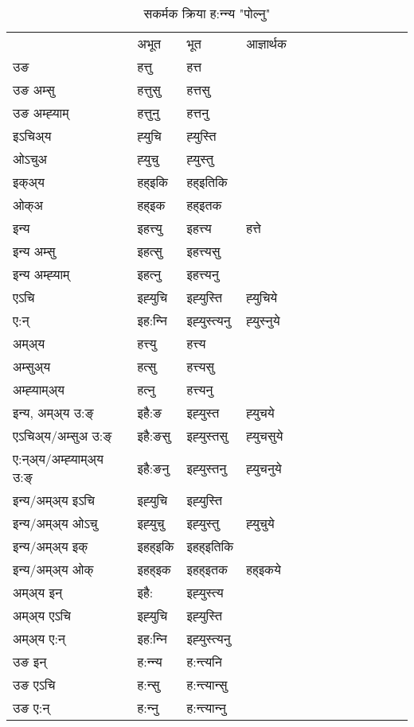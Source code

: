\begin{table}[H]
\centering
\caption{\label{utt.vt} सकर्मक क्रिया  ह:न्‍न्य  "पोल्नु"  }
\begin{tabular}{l|l|l|l|l|l|l|l|l|l|l|l|l}  \toprule
&अभूत & भूत & आज्ञार्थक \\ 
उङ &हत्तु &हत्त \\ 
उङ अम्सु&हत्तुसु &हत्तसु \\ 
उङ अम्ह्‍याम्&हत्तुनु &हत्तनु \\ 
इऽचिअ्य &ह्‍युचि &ह्‍युस्ति   \\ 
ओऽचुअ        &ह्‍युचु &ह्‍युस्तु   \\ 
इक्अ्य&हह्इकि &हह्इतिकि   \\ 
ओक्अ &हह्इक &हह्इतक   \\ 
इन्य & इहत्त्यु  & इहत्त्य &हत्ते  \\ 
इन्य अम्सु& इहत्सु  & इहत्त्यसु   \\ 
इन्य अम्ह्‍याम्& इहत्‍नु  & इहत्त्यनु   \\ 
एऽचि & इह्‍युचि & इह्‍युस्ति &ह्‍युचिये    \\ 
ए:न् & इह:न्‍नि  & इह्‍युस्त्यनु &ह्‍युस्‍नुये  \\ 
अम्अ्य & हत्त्यु  & हत्त्य  \\ 
अम्सुअ्य & हत्सु & हत्त्यसु  \\ 
अम्ह्‍याम्अ्य & हत्‍नु  & हत्त्यनु \\ 
\midrule
इन्य, अम्अ्य उ:ङ्‌ &इहै:ङ &इह्‍युस्त &ह्‍युचये \\ 
एऽचिअ्य/अम्सुअ उ:ङ्‌ &इहै:ङसु &इह्‍युस्तसु &ह्‍युचसुये \\ 
ए:न्अ्य/अम्ह्‍याम्अ्य उ:ङ्‌ &इहै:ङनु &इह्‍युस्तनु &ह्‍युचनुये \\ 
इन्य/अम्अ्य इऽचि &इह्‍युचि &इह्‍युस्ति    \\ 
इन्य/अम्अ्य ओऽचु &इह्‍युचु &इह्‍युस्तु  &ह्‍युचुये  \\ 
इन्य/अम्अ्य इक् &इहह्इकि &इहह्इतिकि   \\ 
इन्य/अम्अ्य ओक् &इहह्इक &इहह्इतक  &हह्इकये  \\ 
अम्अ्य इन् & इहै: & इह्‍युस्त्य   \\ 
अम्अ्य एऽचि & इह्‍युचि & इह्‍युस्ति    \\ 
अम्अ्य ए:न् & इह:न्‍नि  & इह्‍युस्त्यनु  \\ 
\midrule
उङ इन् & ह:न्‍न्य  & ह:न्त्यनि  \\ 
उङ एऽचि & ह:न्सु  & ह:न्त्यान्सु   \\ 
उङ ए:न्& ह:न्‍नु  & ह:न्त्यान्‍नु   \\ 
\bottomrule
\end{tabular}
\end{table}


